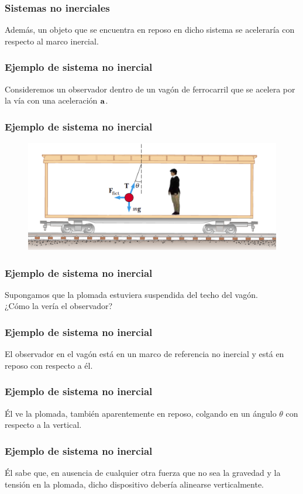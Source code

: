 \documentclass[12pt]{beamer}
\begin{document}
\begin{frame}
\frametitle{Sistemas no inerciales}
Además, un objeto que se encuentra en reposo en dicho sistema se aceleraría con respecto al marco inercial. %
\end{frame}
\begin{frame}
\frametitle{Ejemplo de sistema no inercial}
Consideremos un observador dentro de un vagón de ferrocarril que se acelera por la vía con una aceleración $\vb{a}$.
\end{frame}
\begin{frame}
\frametitle{Ejemplo de sistema no inercial}
\begin{figure}
  \centering
  \includegraphics[scale=0.2]{Imagenes/Sistema_No_Inercial_01.png}
\end{figure}
\end{frame}
\begin{frame}
\frametitle{Ejemplo de sistema no inercial}
Supongamos que la plomada estuviera suspendida del techo del vagón.
\\
\bigskip
\pause
¿Cómo la vería el observador?
\end{frame}
\begin{frame}
\frametitle{Ejemplo de sistema no inercial}
El observador en el vagón está en un marco de referencia no inercial \pause y está en reposo con respecto a él.
\end{frame}
\begin{frame}
\frametitle{Ejemplo de sistema no inercial}
Él ve la plomada, también aparentemente en reposo, colgando en un ángulo $\theta$ con respecto a la vertical.
\end{frame}
\begin{frame}
\frametitle{Ejemplo de sistema no inercial}
Él sabe que, en ausencia de cualquier otra fuerza que no sea la gravedad y la tensión en la plomada, dicho dispositivo debería alinearse verticalmente.
\end{frame}
\end{document}
